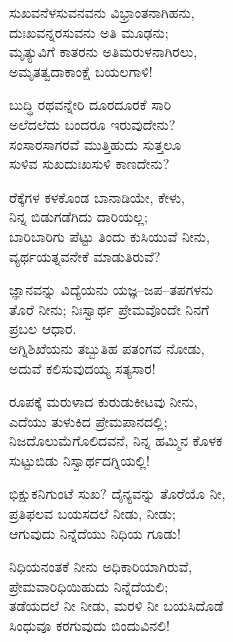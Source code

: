 \begin{myquote}
ಸುಖವನೆಳಸುವನವನು ವಿಭ್ರಾಂತನಾಗಿಹನು,\\ದುಃಖವನ್ನರಸುವನು ಅತಿ ಮೂಢನು;\\ಮೃತ್ಯುವಿಗೆ ಕಾತರನು ಅತಿಮರುಳನಾಗಿರಲು,\\ಅಮೃತತ್ವದಾಕಾಂಕ್ಷೆ ಬಯಲಗಾಳಿ!
\end{myquote}

\begin{myquote}
ಬುದ್ಧಿ ರಥವನ್ನೇರಿ ದೂರದೂರಕೆ ಸಾರಿ\\ಅಲೆದಲೆದು ಬಂದರೂ ಇರುವುದೇನು?\\ಸಂಸಾರಸಾಗರವೆ ಮುತ್ತಿಹುದು ಸುತ್ತಲೂ\\ಸುಳಿವ ಸುಖದುಃಖಸುಳಿ ಕಾಣದೇನು?
\end{myquote}

\begin{myquote}
ರೆಕ್ಕೆಗಳ ಕಳಕೊಂಡ ಬಾನಾಡಿಯೇ, ಕೇಳು,\\ನಿನ್ನ ಬಿಡುಗಡೆಗಿದು ದಾರಿಯಲ್ಲ;\\ಬಾರಿಬಾರಿಗು ಪೆಟ್ಟು ತಿಂದು ಕುಸಿಯುವೆ ನೀನು,\\ವ್ಯರ್ಥಯತ್ನವನೇಕೆ ಮಾಡುತಿರುವೆ?
\end{myquote}

\begin{myquote}
ಜ್ಞಾನವನ್ನು ವಿದ್ಯೆಯನು ಯಜ್ಞ–ಜಪ–ತಪಗಳನು\\ತೊರೆ ನೀನು; ನಿಃಸ್ವಾರ್ಥ ಪ್ರೇಮವೊಂದೇ ನಿನಗೆ\\ಪ್ರಬಲ ಆಧಾರ.\\ಅಗ್ನಿಶಿಖೆಯನು ತಬ್ಬುತಿಹ ಪತಂಗವ ನೋಡು,\\ಅದುವೆ ಕಲಿಸುವುದಯ್ಯ ಸತ್ಯಸಾರ!
\end{myquote}

\begin{myquote}
ರೂಪಕ್ಕೆ ಮರುಳಾದ ಕುರುಡುಕೀಟವು ನೀನು,\\ಎದೆಯು ತುಳುಕಿದ ಪ್ರೇಮಪಾನದಲ್ಲಿ;\\ನಿಜದೊಲುಮೆಗೊಲಿದವನೆ, ನಿನ್ನ ಹಮ್ಮಿನ ಕೊಳಕ\\ಸುಟ್ಟುಬಿಡು ನಿಸ್ವಾರ್ಥದಗ್ನಿಯಲ್ಲಿ!
\end{myquote}

\begin{myquote}
ಭಿಕ್ಷುಕನಿಗುಂಟೆ ಸುಖ? ದೈನ್ಯವನ್ನು ತೊರೆಯೊ ನೀ,\\ಪ್ರತಿಫಲವ ಬಯಸದಲೆ ನೀಡು, ನೀಡು;\\ಆಗುವುದು ನಿನ್ನೆದೆಯು ನಿಧಿಯ ಗೂಡು!
\end{myquote}

\begin{myquote}
ನಿಧಿಯನಂತಕೆ ನೀನು ಅಧಿಕಾರಿಯಾಗಿರುವೆ,\\ಪ್ರೇಮವಾರಿಧಿಯಿಹುದು ನಿನ್ನೆದೆಯಲಿ;\\ತಡೆಯದಲೆ ನೀ ನೀಡು, ಮರಳಿ ನೀ ಬಯಸಿದೊಡೆ\\ಸಿಂಧುವೂ ಕರಗುವುದು ಬಿಂದುವಿನಲಿ!
\end{myquote}

